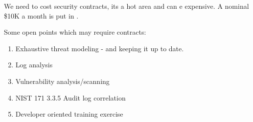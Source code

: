 We need to cost security contracts, its a hot area and can e expensive. A nominal \$10K a month is put in .





Some open points which may require contracts:
\begin{enumerate}
\item Exhaustive threat modeling - and keeping it up to date.
\item Log analysis
\item Vulnerability analysis/scanning
\item NIST 171 3.3.5 Audit log correlation
\item Developer oriented training exercise
\end{enumerate}
